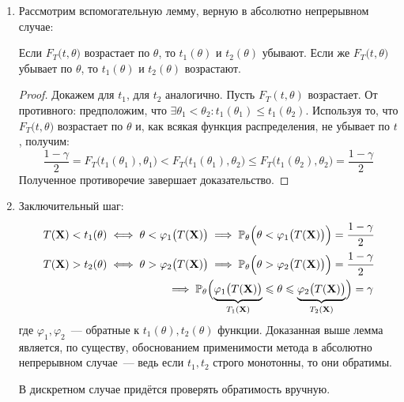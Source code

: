 \begin{enumerate}
    \item Рассмотрим вспомогательную лемму, верную в абсолютно непрерывном случае:
        \begin{lem}
            Если $F_{T}\bigl(t, \theta\bigr)$ возрастает по $\theta$, то $t_{1}(\theta)$ и $t_{2}(\theta)$ убывают. 
            Если же $F_{T}\bigl(t, \theta\bigr)$ убывает по $\theta$, то $t_{1}(\theta)$ и $t_{2}(\theta)$ возрастают.
        \end{lem}
        \begin{proof}
            Докажем для $t_1$, для $t_2$ аналогично.
            Пусть $F_{T}(t, \theta)$ возрастает.
            От противного: предположим, что $\exists \theta_{1}<\theta_{2} \colon t_{1}\left(\theta_{1}\right) \leqslant t_{1}\left(\theta_{2}\right)$.
            Используя то, что $F_{T}\bigl(t, \theta\bigr)$ возрастает по $\theta$ и, как всякая функция распределения, не убывает по $t$, получим:
            \begin{equation*}
                \frac{1-\gamma}{2} = 
                F_{T}\bigl(t_{1}(\theta_{1}), \theta_{1}\bigr) < 
                F_{T}\bigl(t_{1}(\theta_{1}), \theta_{2}\bigr) \leqslant 
                F_{T}\bigl(t_{1}(\theta_{2}), \theta_{2}\bigr) = 
                \frac{1-\gamma}{2}
            \end{equation*}
            Полученное противоречие завершает доказательство.
        \end{proof}
    \item %
        Заключительный шаг:
        \begin{equation*}
            \begin{aligned}
                T(\mathbf{X}) < t_{1}(\theta)
                \iff \theta < \varphi_{1} \bigl(T(\mathbf{X})\bigr)
                \implies
                \operatorname{\operatorname{\mathbb{P}}_{\theta}}\Bigl(\theta<\varphi_{1} \bigl(T(\mathbf{X})\bigr)\Bigr)
                = \cfrac{1-\gamma}{2} \\
                T(\mathbf{X}) > t_{2}(\theta)
                \iff \theta > \varphi_{2} \bigl(T(\mathbf{X})\bigr)
                \implies
                \operatorname{\operatorname{\mathbb{P}}_{\theta}}\Bigl(\theta > \varphi_{2}\bigl(T(\mathbf{X})\bigr)\Bigr)
                = \cfrac{1-\gamma}{2} \\
                \implies
                \operatorname{\operatorname{\mathbb{P}}_{\theta}} \Bigl(\underbrace{\varphi_{1} \bigl(T(\mathbf{X})\bigr)}_{T_{1}(\mathbf{X})}
                \leqslant \theta
                \leqslant \underbrace{\varphi_{2}\bigl(T(\mathbf{X})\bigr)}_{T_{2}(\mathbf{X})} \Bigr)
                = \gamma
            \end{aligned}
        \end{equation*}
        где $\varphi_1, \varphi_2$~--- обратные к $t_1(\theta), t_2(\theta)$ функции. 
        Доказанная выше лемма является, по существу, обоснованием применимости метода в абсолютно непрерывном случае~--- 
        ведь если $t_1, t_2$ строго монотонны, то они обратимы.

        В дискретном случае придётся проверять обратимость вручную.
\end{enumerate}
